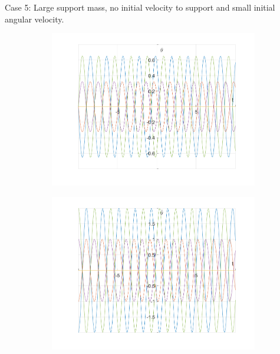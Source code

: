 \documentclass{article}
\begin{document}
	Case 5:
	Large support mass, no initial velocity to support and small initial angular velocity.
			\begin{figure}[h!]
		\centering
		\begin{subfigure}[b]{0.48\linewidth}
			\includegraphics[width=\linewidth]{./SmallOscillations/S5/F1.png}
		\end{subfigure}
		\begin{subfigure}[b]{0.48\linewidth}
			\includegraphics[width=\linewidth]{./SmallOscillations/S5/F2.png}
		\end{subfigure}
	\end{figure}
\end{document}
